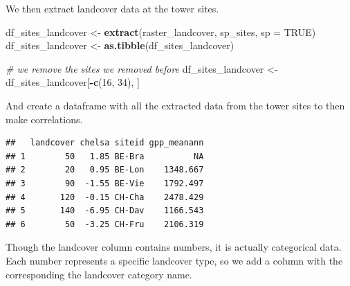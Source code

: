 \documentclass[
]{book}
\newenvironment{Shaded}{\begin{snugshade}}{\end{snugshade}}
\newcommand{\CommentTok}[1]{\textcolor[rgb]{0.56,0.35,0.01}{\textit{#1}}}
\newcommand{\DataTypeTok}[1]{\textcolor[rgb]{0.13,0.29,0.53}{#1}}
\newcommand{\DecValTok}[1]{\textcolor[rgb]{0.00,0.00,0.81}{#1}}
\newcommand{\KeywordTok}[1]{\textcolor[rgb]{0.13,0.29,0.53}{\textbf{#1}}}
\newcommand{\NormalTok}[1]{#1}
\newcommand{\OperatorTok}[1]{\textcolor[rgb]{0.81,0.36,0.00}{\textbf{#1}}}
\newcommand{\OtherTok}[1]{\textcolor[rgb]{0.56,0.35,0.01}{#1}}
\newcommand{\StringTok}[1]{\textcolor[rgb]{0.31,0.60,0.02}{#1}}
\begin{document}
We then extract landcover data at the tower sites.

\begin{Shaded}
\begin{Highlighting}[]
\NormalTok{df_sites_landcover <-}\StringTok{ }\KeywordTok{extract}\NormalTok{(raster_landcover, sp_sites, }\DataTypeTok{sp =} \OtherTok{TRUE}\NormalTok{)}
\NormalTok{df_sites_landcover <-}\StringTok{ }\KeywordTok{as.tibble}\NormalTok{(df_sites_landcover)}

\CommentTok{# we remove the sites we removed before}
\NormalTok{df_sites_landcover <-}\StringTok{ }\NormalTok{df_sites_landcover[}\OperatorTok{-}\KeywordTok{c}\NormalTok{(}\DecValTok{16}\NormalTok{, }\DecValTok{34}\NormalTok{), ]}
\end{Highlighting}
\end{Shaded}

And create a dataframe with all the extracted data from the tower sites to then make correlations.

\begin{Shaded}
\end{Shaded}

\begin{verbatim}
##   landcover chelsa siteid gpp_meanann
## 1        50   1.85 BE-Bra          NA
## 2        20   0.95 BE-Lon    1348.667
## 3        90  -1.55 BE-Vie    1792.497
## 4       120  -0.15 CH-Cha    2478.429
## 5       140  -6.95 CH-Dav    1166.543
## 6        50  -3.25 CH-Fru    2106.319
\end{verbatim}

Though the landcover column contains numbers, it is actually categorical data. Each number represents a specific landcover type, so we add a column with the corresponding the landcover category name.
\end{document}
